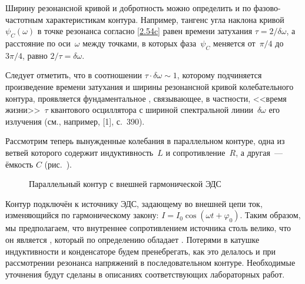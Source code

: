 Ширину резонансной кривой и добротность можно определить и по
фазово-частотным характеристикам контура. Например, тангенс угла наклона
кривой $\psi_C(\omega)$ в точке резонанса согласно \eqref{2.54c} равен времени
затухания $\tau=2/\delta\omega$, а расстояние по оси~$\omega$ между точками, в
которых фаза~$\psi_C$ меняется от~$\pi/4$ до~$3\pi/4$, равно
$2/\tau=\delta\omega$.

Следует отметить, что в соотношении $\tau\cdot\delta\omega\sim1$, которому
подчиняется произведение времени затухания и ширины резонансной кривой
колебательного контура, проявляется фундаментальное , связывающее, в частности, <<время жизни>>~$\tau$ квантового
осциллятора с шириной спектральной линии~$\delta\omega$ его излучения (см.,
например, [1], с.~390).


Рассмотрим теперь вынужденные колебания в параллельном контуре, одна из ветвей
которого содержит индуктивность~$L$ и сопротивление~$R$, а другая~--- ёмкость
$C$ (рис.~).

\begin{figure}[h!]
		\centering
		\caption{Параллельный контур с внешней гармонической ЭДС}
\end{figure}

Контур подключён к источнику ЭДС, задающему во внешней цепи ток, изменяющийся по
гармоническому закону: $I=I_0\cos(\omega t+\varphi_0)$. Таким образом, мы
предполагаем, что внутреннее сопротивлением источника столь велико, что он
является , который по определению обладает
. Потерями в катушке
индуктивности и конденсаторе будем пренебрегать, как это делалось и при
рассмотрении резонанса напряжений в последовательном контуре. Необходимые
уточнения будут сделаны в описаниях соответствующих лабораторных работ.


